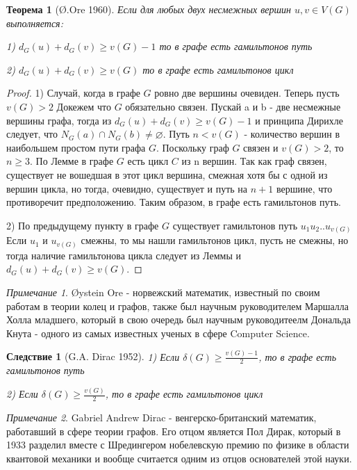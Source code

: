 \documentclass{article}
\renewcommand{\ge}{\geqslant}
\newtheorem{theorem}{Теорема}
\newtheorem{consequence}{Следствие}
\theoremstyle{definition}
\theoremstyle{remark}
\newtheorem*{remark}{Примечание}
\begin{document}
\begin{theorem}[Ø.Ore 1960]
    Если для любых двух несмежных вершин $u,v \in V(G)$ выполняется:
    
    1) $d_G(u) + d_G(v) \ge v(G) - 1$ то в графе есть гамильтонов путь 
    
    2) $d_G(u) + d_G(v) \ge v(G)$ то в графе есть гамильтонов цикл 
\end{theorem}
\begin{proof}
    1) Случай, когда в графе $G$ ровно две вершины очевиден. Теперь пусть $v(G) > 2$ 
    Докежем что $G$ обязательно связен. Пускай a и b - две несмежные вершины графа, тогда из $d_G(u) + d_G(v) \ge v(G) - 1$ и принципа Дирихле следует, что $N_G(a) \cap N_G(b) \not= \varnothing$.
    Путь $n < v(G)$ - количество вершин в наибольшем простом пути графа $G$. Поскольку граф $G$ связен и $v(G) > 2$, то $n \ge 3$. По Лемме  в графе $G$ есть цикл $C$ из n вершин. Так как граф связен, существует не вошедшая в этот цикл вершина, смежная хотя бы с одной из вершин цикла, но тогда, очевидно, существует и путь на $n + 1$ вершине, что противоречит предположению. Таким образом, в графе есть гамильтонов путь.

    2) По предыдущему пункту в графе $G$ существует гамильтонов путь $u_1u_2..u_{v(G)}$ 
    Если $u_1$ и $u_{v(G)}$ смежны, то мы нашли гамильтонов цикл, пусть не смежны, но тогда наличие гамильтонова цикла следует из Леммы  и $d_G(u) + d_G(v) \ge v(G)$. 
\end{proof}

\begin{remark}
    Øystein Ore - норвежский математик, известный по своим работам в теории колец и графов, также был научным руководителем Маршалла Холла младшего, который в свою очередь был научным руководитеелм Дональда Кнута - одного из самых известных ученых в сфере Computer Science.
\end{remark}

\begin{consequence} [G.A. Dirac 1952]

    1) Если $\delta(G) \ge \frac{v(G) - 1}{2}$, то в графе есть гамильтонов путь

    2) Если $\delta(G) \ge \frac{v(G)}{2}$, то в графе есть гамильтонов цикл
\end{consequence}

\begin{remark}
    Gabriel Andrew Dirac - венгерско-британский математик, работавший в сфере теории графов. Его отцом является Пол Дирак, который в 1933 разделил вместе с Шредингером нобелевскую премию по физике в области квантовой механики и вообще считается одним из отцов основателей этой науки.  
\end{remark}
\end{document}
